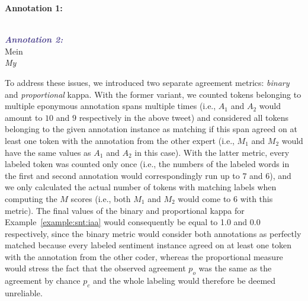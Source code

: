 \begin{example}\label{example:snt:iaa}
\textcolor{red3}{\textbf{Annotation 1:}}\\
\upshape{}\\

\noindent\textcolor{darkslateblue}{\textbf{\itshape Annotation 2:}}\\
Mein \\
\itshape My \upshape{}
\end{example}

To address these issues, we introduced two separate agreement metrics:
\emph{binary} and \emph{proportional} kappa.  With the former variant,
we counted tokens belonging to multiple eponymous annotation spans
multiple times (i.e., $A_1$ and $A_2$ would amount to $10$ and $9$
respectively in the above tweet) and considered all tokens belonging
to the given annotation instance as matching if this span agreed on at
least one token with the annotation from the other expert (i.e., $M_1$
and $M_2$ would have the same values as $A_1$ and $A_2$ in this case).
With the latter metric, every labeled token was counted only once
(i.e., the numbers of the labeled words in the first and second
annotation would correspondingly run up to $7$ and $6$), and we only
calculated the actual number of tokens with matching labels when
computing the $M$ scores (i.e., both $M_1$ and $M_2$ would come to $6$
with this metric).  The final values of the binary and proportional
kappa for Example~\ref{example:snt:iaa} would consequently be equal to
1.0 and 0.0 respectively, since the binary metric would consider both
annotations as perfectly matched because every labeled sentiment
instance agreed on at least one token with the annotation from the
other coder, whereas the proportional measure would stress the fact
that the observed agreement $p_o$ was the same as the agreement by
chance $p_c$ and the whole labeling would therefore be deemed
unreliable.

